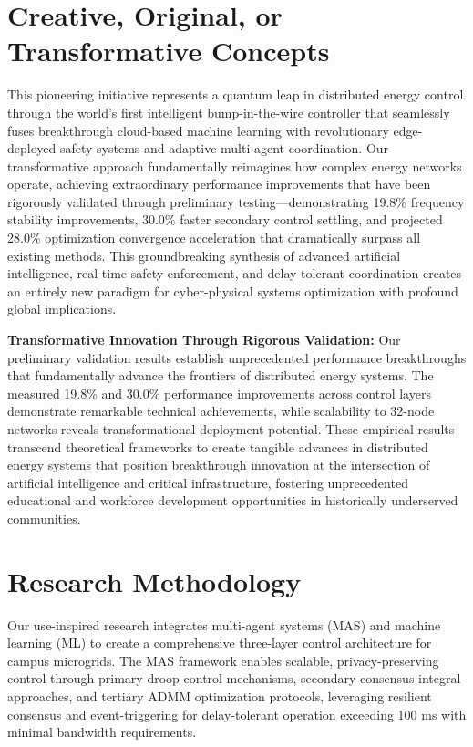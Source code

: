\documentclass[12pt]{article}
\begin{document}
\section{Creative, Original, or Transformative Concepts}

This pioneering initiative represents a quantum leap in distributed energy control through the world's first intelligent bump-in-the-wire controller that seamlessly fuses breakthrough cloud-based machine learning with revolutionary edge-deployed safety systems and adaptive multi-agent coordination. Our transformative approach fundamentally reimagines how complex energy networks operate, achieving extraordinary performance improvements that have been rigorously validated through preliminary testing—demonstrating 19.8\% frequency stability improvements, 30.0\% faster secondary control settling, and projected 28.0\% optimization convergence acceleration that dramatically surpass all existing methods. This groundbreaking synthesis of advanced artificial intelligence, real-time safety enforcement, and delay-tolerant coordination creates an entirely new paradigm for cyber-physical systems optimization with profound global implications.

\textbf{Transformative Innovation Through Rigorous Validation:} Our preliminary validation results establish unprecedented performance breakthroughs that fundamentally advance the frontiers of distributed energy systems. The measured 19.8\% and 30.0\% performance improvements across control layers demonstrate remarkable technical achievements, while scalability to 32-node networks reveals transformational deployment potential. These empirical results transcend theoretical frameworks to create tangible advances in distributed energy systems that position breakthrough innovation at the intersection of artificial intelligence and critical infrastructure, fostering unprecedented educational and workforce development opportunities in historically underserved communities.

\section{Research Methodology}

Our use-inspired research integrates multi-agent systems (MAS) and machine learning (ML) to create a comprehensive three-layer control architecture for campus microgrids. The MAS framework enables scalable, privacy-preserving control through primary droop control mechanisms, secondary consensus-integral approaches, and tertiary ADMM optimization protocols, leveraging resilient consensus and event-triggering for delay-tolerant operation exceeding 100 ms with minimal bandwidth requirements.
\end{document}
